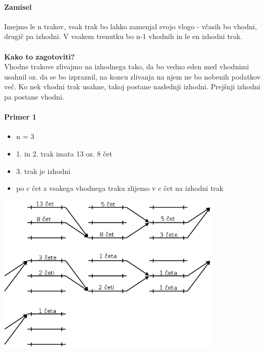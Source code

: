 \documentclass[a4paper,10pt]{article}
\begin{document}
\paragraph{Zamisel}
Imejmo le n trakov, vsak trak bo lahko zamenjal svojo vlogo - v\v casih bo vhodni, drugi\v c pa izhodni. V vsakem trenutku bo n-1 vhodnih in le en izhodni trak.\\
\\
\textbf{Kako to zagotoviti?}\\
Vhodne trakove zlivajmo na izhodnega tako, da bo vedno eden med vhodnimi usahnil oz. da se bo izpraznil, na koncu zlivanja na njem ne bo nobenih podatkov ve\v c. Ko nek vhodni trak usahne, takoj postane naslednji izhodni. Prej\v snji izhodni pa postane vhodni.

\paragraph{Primer 1}
\begin{itemize}
\item n = 3
\item 1. in 2. trak imata 13 oz. 8 \v cet
\item 3. trak je izhodni
\item po c \v cet z vsakega vhodnega traku zlijemo v c \v cet na izhodni trak
\end{itemize}
	\begin{center}
	\includegraphics[width=10.8cm,height=7.6cm]{Slike/PolifaznoZlivanjePrimer1.png}
	\end{center}
\end{document}

